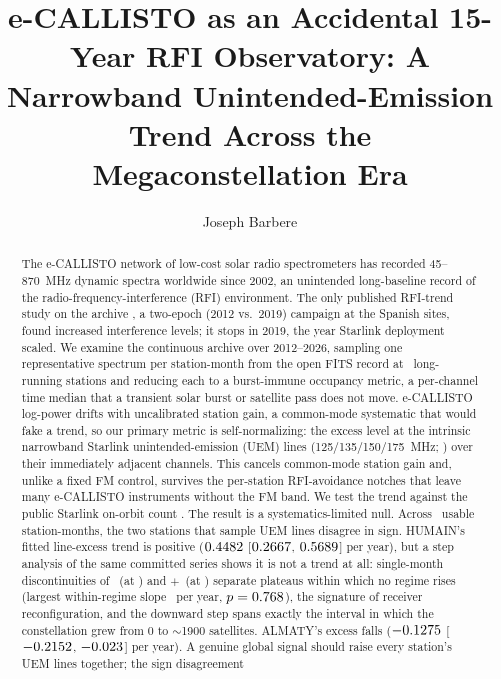 \documentclass[twocolumn]{aastex631}
\begin{document}
\title{e-CALLISTO as an Accidental 15-Year RFI Observatory: A Narrowband
Unintended-Emission Trend Across the Megaconstellation Era}
\author[0009-0008-3289-4447]{Joseph Barbere}

\begin{abstract}
The e-CALLISTO network of low-cost solar radio spectrometers \citep{benz2009} has recorded
45--870~MHz dynamic spectra worldwide since 2002, an unintended long-baseline record of the
radio-frequency-interference (RFI) environment. The only published RFI-trend study on the
archive \citep{prieto2020}, a two-epoch (2012 vs.\ 2019) campaign at the Spanish sites, found
increased interference levels; it stops in 2019, the year Starlink deployment scaled. We examine
the continuous archive over 2012--2026, sampling one representative spectrum per station-month
from the open FITS record at \rfRealNStations\ long-running stations and reducing each to a
burst-immune occupancy metric, a per-channel time median that a transient solar burst or
satellite pass does not move. e-CALLISTO log-power drifts with uncalibrated station gain, a
common-mode systematic that would fake a trend, so our primary metric is self-normalizing: the
excess level at the intrinsic narrowband Starlink unintended-emission (UEM) lines
(125/135/150/175~MHz; \citealt{divruno2023}) over their immediately adjacent channels. This
cancels common-mode station gain and, unlike a fixed FM control, survives the per-station
RFI-avoidance notches that leave many e-CALLISTO instruments without the FM band. We test the
trend against the public Starlink on-orbit count \citep{planet4589}. The result is a
systematics-limited null. Across \rfRealNMonths\ usable station-months, the two stations that
sample UEM lines disagree in sign. HUMAIN's fitted line-excess trend is positive
($0.4482$ [$0.2667$, $0.5689$] per year), but a step
analysis of the same committed series shows it is not a trend at all: single-month
discontinuities of \rfRealHumStepTwoDelta\ (at \rfRealHumStepTwoYr) and
$+$\rfRealHumStepThreeDelta\ (at \rfRealHumStepThreeYr) separate plateaus within which no regime
rises (largest within-regime slope \rfRealHumMaxRegimeSlope\ per year, $p=0.768$),
the signature of receiver reconfiguration, and the downward step spans exactly the interval in
which the constellation grew from 0 to $\sim$1900 satellites. ALMATY's excess falls
($-0.1275$ [$-0.2152$, $-0.023$] per year). A genuine
global signal should raise every station's UEM lines together; the sign disagreement

\end{abstract}
\end{document}
